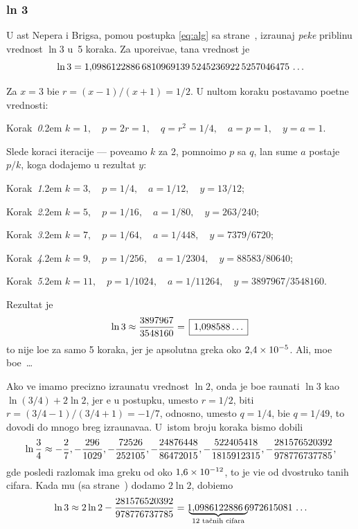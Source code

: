 \subsubsection{ln 3}\label{sssec:ln3}
 
\zadatak
U {\cv}ast Nepera i Brigsa,
pomo{\cc}u postupka \eqref{eq:alg} sa 
strane~\pageref{eq:alg},
izra{\cv}unaj {\sl pe{\sv}ke\/} pribli{\zv}nu vrednost $\ln 3$
u~5 koraka. Za upore{\dj}iva{\nj}e, ta{\cv}na vrednost je
$$
\ln3=1\.
0986122886\,
6810969139\,
5245236922\,
5257046475\,\ldots
$$

\def\step#1{\par\indent\leavevmode
  Korak~{\it#1}.\kern2em\relax}

\resenje
Za $x=3$ bi{\cc}e $r=(x-1)/(x+1)=1/2$. U nultom koraku postav{\lj}amo po{\cv}etne vrednosti:

\smallskip

\step0 $k=1,\quad p=2r=1,\quad q=r^2=1/4,\quad a=p=1,\quad y=a=1$.

\smallskip

\noindent Slede koraci iteracije --- pove{\cc}amo $k$ za 2, pomno{\zv}imo $p$ sa $q$,
{\cv}lan sume $a$ postaje $p/k$, koga dodajemo u rezultat $y$:

\smallskip

\step1 $k=3,\quad p=1/4,\quad a=1/12,\quad y=13/12$;
\step2 $k=5,\quad p=1/16,\quad a=1/80,\quad y=263/240$;
\step3 $k=7,\quad p=1/64,\quad a=1/448,\quad y=7379/6720$;
\step4 $k=9,\quad p=1/256,\quad a=1/2304,\quad y=88583/80640$;
\step5 $k=11,\quad p=1/1024,\quad a=1/11264,\quad y=3897967/3548160$.

\smallskip

\noindent Rezultat je
$$
\ln3\approx\frac{3897967}{3548160}=
\ram{1\.098588\ldots} 
$$
{\sv}to nije lo{\sv}e za samo 5 koraka, jer je apsolutna gre{\sv}ka oko $2\.4\puta10^{-5}$.
Ali, mo{\zv}e bo{\lj}e~\dots

\dodatak
Ako ve{\cc} imamo precizno izra{\cv}unatu vrednost $\ln2$, onda je bo{\lj}e ra{\cv}unati $\ln3$ kao $\ln(3/4)+2\ln2$,
jer {\cc}e u postupku, umesto $r=1/2$, biti $r=(3/4-1)/(3/4+1)=-1/7$, 
odnosno, umesto $q=1/4$, bi{\cc}e $q=1/49$,
{\sv}to dovodi do mnogo br{\zv}eg izra{\cv}unava{\nj}a. U~istom broju koraka bismo dobili
$$
\ln\frac34\approx
-\ff2/7, -\ff296/1029, -\ff72526/252105, -\ff24876448/86472015, 
-\ff522405418/1815912315, -\ff281576520392/978776737785,
$$
gde posled{\nj}i razlomak ima gre{\sv}ku od oko $1\.6\puta10^{-12}$,
{\sv}to je vi{\sv}e od dvostruko ta{\cv}nih cifara.
Kada mu (sa strane~\pageref{eq:ln2}) dodamo $2\ln2$, dobi{\cc}emo
$$
\ln3\approx 2\ln2 -\frac{281576520392}{978776737785} =
{\,\underbrace{\!1\.0986122886\,6\!}_{\hbox{\scriptsize 12 ta{\cv}nih cifara}}972615081\,\ldots}
$$

